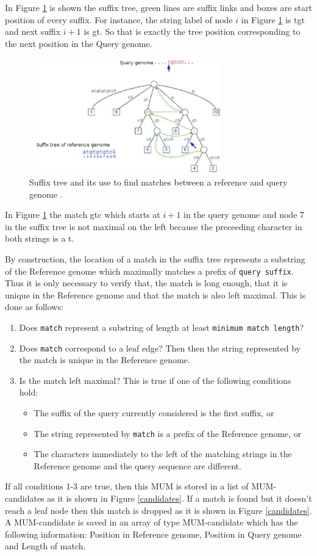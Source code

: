\documentclass[conference]{IEEEtran}
\begin{document}
In Figure \ref{fig:st} is shown the suffix tree, green lines are suffix links and boxes are start position of every suffix. For instance, the string label of node $i$ in Figure \ref{fig:st} is tgt and next suffix $i+1$ is gt. So that is exactly the tree position corresponding to the next position in the Query genome.

\begin{figure}[htb]
  \centering
  \includegraphics[width=8.5cm,height=5cm]{st-mum.pdf}
  \caption{Suffix tree and its use to find matches between a reference and query genome \cite{Delcher2002}.}
\label{fig:st}
\end{figure}

In Figure \ref{fig:st} the match gtc which starts at $i+1$ in the query genome and node 7 in the suffix tree is not maximal on the left because the preceeding character in both strings is a t.

  By construction, the location of a match in the suffix tree represents a substring of the Reference genome which maximally matches a prefix of \texttt{query suffix}. Thus it is only necessary to verify that, the match is long enough, that it is unique in the Reference genome and that the match is also left maximal. This is done as follows:
\begin{enumerate}
  \item
  Does \texttt{match} represent a substring of length at least \texttt{minimum match length}?
   \item Does \texttt{match} correspond to a leaf edge? Then  then the string represented by the match is unique in the Reference genome.
  \item Is the match left maximal? This is true if one of the following conditions hold:
  \begin{itemize}
  \item   
  The suffix of the query currently considered is the first suffix, or 
  \item 
  The string represented by \texttt{match} is a prefix of the Reference genome,  or
  \item  
  The characters immediately to the left of the matching strings in the Reference genome and the query sequence are different.
  \end{itemize}
  \end{enumerate}
  If all conditions 1-3 are true, then this MUM is stored in a list of MUM-candidates as it is shown in Figure \ref{candidates}. If a match is found but it doesn't reach a leaf node then this match is dropped as it is shown in Figure \ref{candidates}. A MUM-candidate is saved in an array of type MUM-candidate which has the following information:
Position in Reference genome, Position in Query genome and Length of match.
\end{document}
